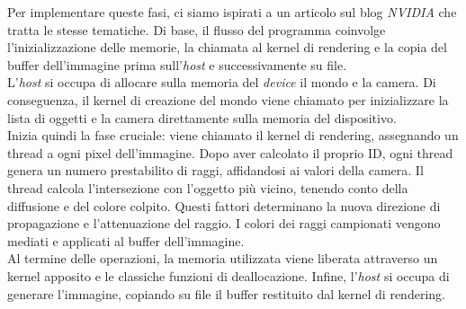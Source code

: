 \documentclass[main.tex]{subfiles}
\begin{document}
Per implementare queste fasi, ci siamo ispirati a un articolo sul blog \textit{NVIDIA}\cite{rtCUDA} che tratta le stesse tematiche. Di base, il flusso del programma coinvolge l'inizializzazione delle memorie, la chiamata al kernel di rendering e la copia del buffer dell'immagine prima sull'\textit{host} e successivamente su file. \\
L'\textit{host} si occupa di allocare sulla memoria del \textit{device} il mondo e la camera. Di conseguenza, il kernel di creazione del mondo viene chiamato per inizializzare la lista di oggetti e la camera direttamente sulla memoria del dispositivo. \\
Inizia quindi la fase cruciale: viene chiamato il kernel di rendering, assegnando un thread a ogni pixel dell'immagine. Dopo aver calcolato il proprio ID, ogni thread genera un numero prestabilito di raggi, affidandosi ai valori della camera. Il thread calcola l'intersezione con l'oggetto più vicino, tenendo conto della diffusione e del colore colpito. Questi fattori determinano la nuova direzione di propagazione e l'attenuazione del raggio. I colori dei raggi campionati vengono mediati e applicati al buffer dell'immagine. \\
Al termine delle operazioni, la memoria utilizzata viene liberata attraverso un kernel apposito e le classiche funzioni di deallocazione. Infine, l'\textit{host} si occupa di generare l'immagine, copiando su file il buffer restituito dal kernel di rendering. 
\end{document}
